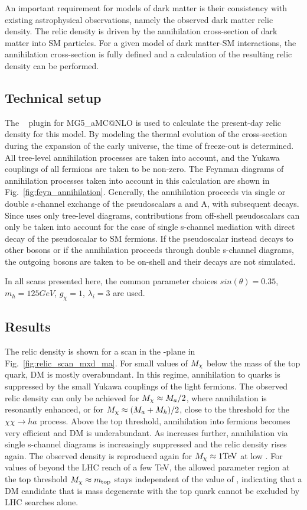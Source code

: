 \newcommand{\mgamcnlo}{MG5\_aMC@NLO\xspace}
\newcommand{\A}{A}

An important requirement for models of dark matter is their consistency with existing astrophysical observations, namely the observed dark matter relic density.
The relic density is driven by the annihilation cross-section of dark matter into SM particles.
For a given model of dark matter-SM interactions, the annihilation cross-section is fully defined and a calculation of the resulting relic density can be performed. 

\subsection{Technical setup}
The \maddm~\cite{Backovic:2013dpa,Backovic:2015cra} plugin for \mgamcnlo is used to calculate the present-day relic density for this model.
By modeling the thermal evolution of the cross-section during the expansion of the early universe, the time of freeze-out is determined.
All tree-level annihilation processes are taken into account, and the Yukawa couplings of all fermions are taken to be non-zero.
The Feynman diagrams of annihilation processes taken into account in this calculation are shown in Fig.~\ref{fig:feyn_annihilation}. Generally, the annihilation proceeds via single or double s-channel exchange of the pseudoscalars a and A, with subsequent decays. Since \maddm uses only tree-level diagrams, contributions from off-shell pseudoscalars can only be taken into account for the case of single s-channel mediation with direct decay of the pseudoscalar to SM fermions. If the pseudoscalar instead decays to other bosons or if the annihilation proceeds through double s-channel diagrams, the outgoing bosons are taken to be on-shell and their decays are not simulated. 

In all scans presented here, the common parameter choices $sin(\theta)=0.35$, $m_{h} = 125 GeV$, $g_{\chi}=1$, $\lambda_i = 3$ are used.

\subsection{Results}
The relic density is shown for a scan in the \ma-\mDM plane in Fig.~\ref{fig:relic_scan_mxd_ma}.
For small values of $M_{\chi}$ below the mass of the top quark, DM is mostly overabundant. In this regime, annihilation to quarks is suppressed by the small Yukawa couplings of the light fermions. The observed relic density can only be achieved for $M_{\chi}\approx M_{a}/2$, where annihilation is resonantly enhanced, or for $M_{\chi} \approx (M_{a}+M_{h})/2$, close to the threshold for the $\chi\chi\rightarrow h a$ process.
Above the top threshold, annihilation into fermions becomes very efficient and DM is underabundant. As \mDM increases further, annihilation via single s-channel diagrams is increasingly suppressed and the relic density rises again. The observed density is reproduced again for $M_{\chi}\approx1 \mathrm{TeV}$ at low \ma.
For values of \ma beyond the LHC reach of a few TeV, the allowed parameter region at the top threshold $M_{\chi}\approx m_{\mathrm{top}}$ stays independent of the value of \ma, indicating that a DM candidate that is mass degenerate with the top quark cannot be excluded by LHC searches alone.

